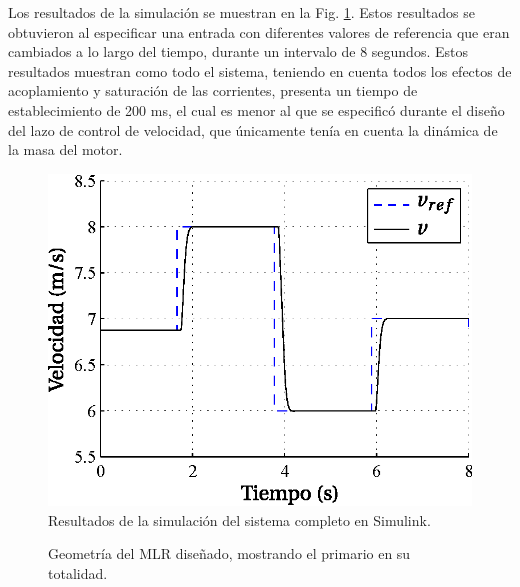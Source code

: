 Los resultados de la simulación se muestran en la Fig. \ref{fig:finalresponse}. Estos resultados se obtuvieron al especificar una entrada con diferentes valores de referencia que eran cambiados a lo largo del tiempo, durante un intervalo de 8 segundos. Estos resultados muestran como todo el sistema, teniendo en cuenta todos los efectos de acoplamiento y saturación de las corrientes, presenta un tiempo de establecimiento de 200 ms, el cual es menor al que se especificó durante el diseño del lazo de control de velocidad, que únicamente tenía en cuenta la dinámica de la masa del motor.

\begin{figure}[hbtp]
\centering
\includegraphics[scale=0.8]{../img/Diseno_de_un_controlador_de_velocidad/finalresponse.eps}
\caption{Resultados de la simulación del sistema completo en Simulink.}
\label{fig:finalresponse}
\end{figure}


\begin{figure}[!]
\centering
{}
\caption{Geometría del MLR diseñado, mostrando el primario en su totalidad.}
\label{fig:closedloop}
\end{figure}

